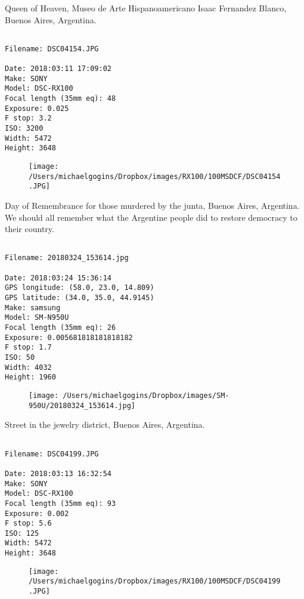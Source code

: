 \documentclass[11pt,letter,DIV=14,paper=landscape]{scrbook}
\begin{document}
\clearpage
\noindent Queen of Heaven, Museo de Arte Hispanoamericano Isaac Fernandez Blanco, Buenos Aires, Argentina.
\noindent
\begin{lstlisting}

Filename: DSC04154.JPG

Date: 2018:03:11 17:09:02
Make: SONY
Model: DSC-RX100
Focal length (35mm eq): 48
Exposure: 0.025
F stop: 3.2
ISO: 3200
Width: 5472
Height: 3648
\end{lstlisting}
\clearpage

\begin{figure}
\texttt{[image: /Users/michaelgogins/Dropbox/images/RX100/100MSDCF/DSC04154.JPG]}
\end{figure}
    
\clearpage
\noindent Day of Remembrance for those murdered by the junta, Buenos Aires, Argentina. We should all remember what the Argentine people did to restore democracy to their country.
\noindent
\begin{lstlisting}

Filename: 20180324_153614.jpg

Date: 2018:03:24 15:36:14
GPS longitude: (58.0, 23.0, 14.809)
GPS latitude: (34.0, 35.0, 44.9145)
Make: samsung
Model: SM-N950U
Focal length (35mm eq): 26
Exposure: 0.005681818181818182
F stop: 1.7
ISO: 50
Width: 4032
Height: 1960
\end{lstlisting}
\clearpage

\begin{figure}
\texttt{[image: /Users/michaelgogins/Dropbox/images/SM-950U/20180324\_153614.jpg]}
\end{figure}
    
\clearpage
\noindent Street in the jewelry district, Buenos Aires, Argentina.
\noindent
\begin{lstlisting}

Filename: DSC04199.JPG

Date: 2018:03:13 16:32:54
Make: SONY
Model: DSC-RX100
Focal length (35mm eq): 93
Exposure: 0.002
F stop: 5.6
ISO: 125
Width: 5472
Height: 3648
\end{lstlisting}
\clearpage

\begin{figure}
\texttt{[image: /Users/michaelgogins/Dropbox/images/RX100/100MSDCF/DSC04199.JPG]}
\end{figure}
    
\end{document}

